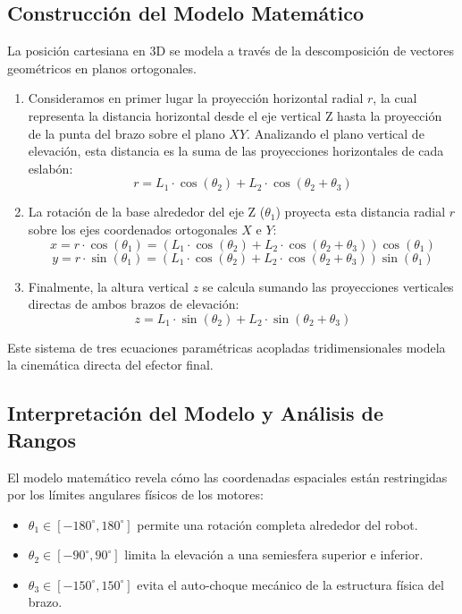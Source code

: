 \documentclass[11pt,a4paper]{article}
\begin{document}
\subsection{Construcción del Modelo Matemático}
La posición cartesiana en 3D se modela a través de la descomposición de vectores geométricos en planos ortogonales. 
\begin{enumerate}
    \item Consideramos en primer lugar la proyección horizontal radial $r$, la cual representa la distancia horizontal desde el eje vertical Z hasta la proyección de la punta del brazo sobre el plano $XY$. Analizando el plano vertical de elevación, esta distancia es la suma de las proyecciones horizontales de cada eslabón:
    $$r = L_1 \cdot \cos(\theta_2) + L_2 \cdot \cos(\theta_2 + \theta_3)$$
    
    \item La rotación de la base alrededor del eje Z ($\theta_1$) proyecta esta distancia radial $r$ sobre los ejes coordenados ortogonales $X$ e $Y$:
    $$x = r \cdot \cos(\theta_1) = \left( L_1 \cdot \cos(\theta_2) + L_2 \cdot \cos(\theta_2 + \theta_3) \right) \cos(\theta_1)$$
    $$y = r \cdot \sin(\theta_1) = \left( L_1 \cdot \cos(\theta_2) + L_2 \cdot \cos(\theta_2 + \theta_3) \right) \sin(\theta_1)$$
    
    \item Finalmente, la altura vertical $z$ se calcula sumando las proyecciones verticales directas de ambos brazos de elevación:
    $$z = L_1 \cdot \sin(\theta_2) + L_2 \cdot \sin(\theta_2 + \theta_3)$$
\end{enumerate}

Este sistema de tres ecuaciones paramétricas acopladas tridimensionales modela la cinemática directa del efector final.

\subsection{Interpretación del Modelo y Análisis de Rangos}
El modelo matemático revela cómo las coordenadas espaciales están restringidas por los límites angulares físicos de los motores:
\begin{itemize}
    \item $\theta_1 \in [-180^\circ, 180^\circ]$ permite una rotación completa alrededor del robot.
    \item $\theta_2 \in [-90^\circ, 90^\circ]$ limita la elevación a una semiesfera superior e inferior.
    \item $\theta_3 \in [-150^\circ, 150^\circ]$ evita el auto-choque mecánico de la estructura física del brazo.
\end{itemize}
\end{document}
